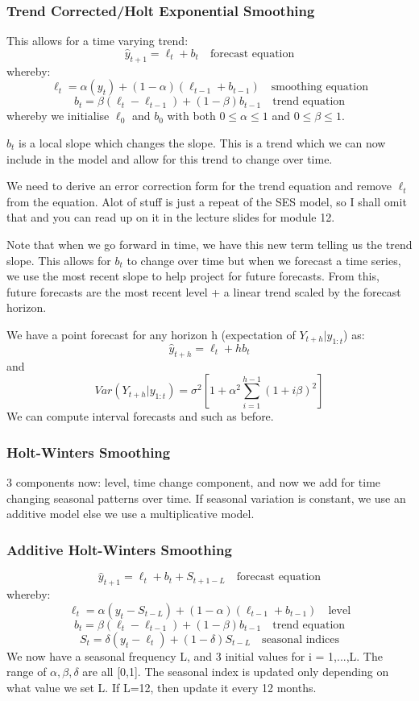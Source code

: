 \documentclass[11pt, oneside]{article}
\theoremstyle{definition}
\begin{document}
\subsubsection{Trend Corrected/Holt Exponential Smoothing}
This allows for a time varying trend:
$$
\hat{y}_{t+1} = \ell_t + b_t \quad \text{forecast equation}
$$
whereby:
$$
\ell_t = \alpha(y_t) + (1-\alpha)(\ell_{t-1}+b_{t-1}) \quad \text{smoothing equation}
$$
$$
b_t = \beta(\ell_t - \ell_{t-1}) + (1-\beta)b_{t-1} \quad \text{trend equation}
$$
whereby we initialise $\ell_0$ and $b_0$ with both $0 \leq \alpha \leq 1$ and $0 \leq \beta \leq 1$.

$b_t$ is a local slope which changes the slope. This is a trend which we can now include in the model and allow for this trend to change over time.

We need to derive an error correction form for the trend equation and remove $\ell_t$ from the equation. Alot of stuff is just a repeat of the SES model, so I shall omit that and you can read up on it in the lecture slides for module 12.

Note that when we go forward in time, we have this new term telling us the trend slope. This allows for $b_t$ to change over time but when we forecast a time series, we use the most recent slope to help project for future forecasts. From this, future forecasts are the most recent level + a linear trend scaled by the forecast horizon.

We have a point forecast for any horizon h (expectation of $Y_{t+h}|y_{1:t}$) as:
$$
\hat{y}_{t+h} = \ell_t + hb_t
$$
and
$$
Var(Y_{t+h}|y_{1:t}) = \sigma^2[1 + \alpha^2 \sum\limits_{i=1}^{h-1}(1 + i\beta)^2]
$$
We can compute interval forecasts and such as before.

\subsubsection{Holt-Winters Smoothing}
3 components now: level, time change component, and now we add for time changing seasonal patterns over time. If seasonal variation is constant, we use an additive model else we use a multiplicative model.
\subsubsection{Additive Holt-Winters Smoothing}
$$
\hat{y}_{t+1} = \ell_t + b_t + S_{t+1-L}\quad \text{forecast equation}
$$
whereby:
$$
\ell_t = \alpha(y_t - S_{t-L}) + (1-\alpha)(\ell_{t-1}+b_{t-1}) \quad \text{level}
$$
$$
b_t = \beta(\ell_t - \ell_{t-1}) + (1-\beta)b_{t-1} \quad \text{trend equation}
$$
$$
S_t = \delta(y_t - \ell_t) + (1 - \delta)S_{t-L} \quad \text{seasonal indices}
$$
We now have a seasonal frequency L, and 3 initial values for i = 1,...,L. The range of $\alpha, \beta, \delta$ are all [0,1].
The seasonal index is updated only depending on what value we set L. If L=12, then update it every 12 months.
\end{document}
